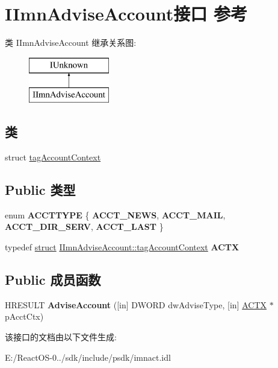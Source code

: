 \hypertarget{interface_i_imn_advise_account}{}\section{I\+Imn\+Advise\+Account接口 参考}
\label{interface_i_imn_advise_account}
类 I\+Imn\+Advise\+Account 继承关系图\+:\begin{figure}[H]
\begin{center}
\leavevmode
\includegraphics[height=2.000000cm]{interface_i_imn_advise_account}
\end{center}
\end{figure}
\subsection*{类}
\begin{DoxyCompactItemize}
\item 
struct \hyperlink{struct_i_imn_advise_account_1_1tag_account_context}{tag\+Account\+Context}
\end{DoxyCompactItemize}
\subsection*{Public 类型}
\begin{DoxyCompactItemize}
\item 
\mbox{\label{interface_i_imn_advise_account_a5a025c2e93e741b3794817097242fcfb}} 
enum {\bfseries A\+C\+C\+T\+T\+Y\+PE} \{ {\bfseries A\+C\+C\+T\+\_\+\+N\+E\+WS}, 
{\bfseries A\+C\+C\+T\+\_\+\+M\+A\+IL}, 
{\bfseries A\+C\+C\+T\+\_\+\+D\+I\+R\+\_\+\+S\+E\+RV}, 
{\bfseries A\+C\+C\+T\+\_\+\+L\+A\+ST}
 \}
\item 
\mbox{\label{interface_i_imn_advise_account_a2f3fea2a29e3fb75c1a662ce25dbd8a1}} 
typedef \hyperlink{interfacestruct}{struct} \hyperlink{struct_i_imn_advise_account_1_1tag_account_context}{I\+Imn\+Advise\+Account\+::tag\+Account\+Context} {\bfseries A\+C\+TX}
\end{DoxyCompactItemize}
\subsection*{Public 成员函数}
\begin{DoxyCompactItemize}
\item 
\mbox{\label{interface_i_imn_advise_account_a9c7812a31a067a05fbe7ac384ee1963c}} 
H\+R\+E\+S\+U\+LT {\bfseries Advise\+Account} (\mbox{[}in\mbox{]} D\+W\+O\+RD dw\+Advise\+Type, \mbox{[}in\mbox{]} \hyperlink{struct_i_imn_advise_account_1_1tag_account_context}{A\+C\+TX} $\ast$p\+Acct\+Ctx)
\end{DoxyCompactItemize}


该接口的文档由以下文件生成\+:\begin{DoxyCompactItemize}
\item 
E\+:/\+React\+O\+S-\/0../sdk/include/psdk/imnact.\+idl\end{DoxyCompactItemize}
